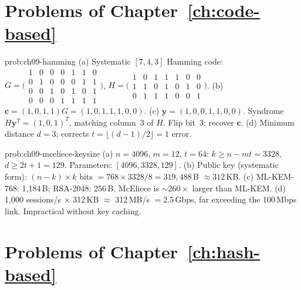 \section*{Problems of Chapter~\ref{ch:code-based}}

\begin{sol}{prob:ch09-hamming}
(a) Systematic $[7,4,3]$ Hamming code:
$G=\bigl(\begin{smallmatrix}1&0&0&0&1&1&0\\0&1&0&0&0&1&1\\0&0&1&0&1&0&1\\0&0&0&1&1&1&1\end{smallmatrix}\bigr)$, \;
$H=\bigl(\begin{smallmatrix}1&0&1&1&1&0&0\\1&1&0&1&0&1&0\\0&1&1&1&0&0&1\end{smallmatrix}\bigr)$.
(b) $\mathbf{c}=(1,0,1,1)G = (1,0,1,1,1,0,0)$.
(c) $\mathbf{y}=(1,0,0,1,1,0,0)$.  Syndrome $H\mathbf{y}^T=(1,0,1)^T$, matching column~3 of $H$.  Flip bit~3: recover $\mathbf{c}$.\;\checkmark
(d) Minimum distance $d=3$; corrects $t=\lfloor(d-1)/2\rfloor=1$ error.
\end{sol}

\begin{sol}{prob:ch09-mceliece-keysize}
(a) $n=4096$, $m=12$, $t=64$: $k\geq n-mt=3328$, $d\geq 2t+1=129$.  Parameters: $[4096,3328,129]$.
(b) Public key (systematic form): $(n-k)\times k$ bits $= 768\times 3328/8 = 319{,}488$\,B $\approx 312$\,KB.
(c) ML-KEM-768: 1,184\,B; RSA-2048: 256\,B.  McEliece is $\sim\!260\times$ larger than ML-KEM.
(d) 1,000 sessions/s $\times$ 312\,KB $\approx$ 312\,MB/s $= 2.5$\,Gbps, far exceeding the 100\,Mbps link.  Impractical without key caching.
\end{sol}

\section*{Problems of Chapter~\ref{ch:hash-based}}

